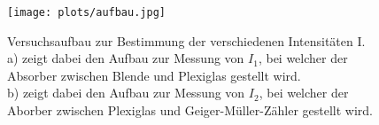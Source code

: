\begin{figure}[H]
    \centering
    \texttt{[image: plots/aufbau.jpg]}
    \caption{Versuchsaufbau zur Bestimmung der verschiedenen Intensitäten I.\\
        a) zeigt dabei den Aufbau zur Messung von $I_1$, bei welcher der Absorber zwischen 
        Blende und Plexiglas gestellt wird.\\
        b) zeigt dabei den Aufbau zur Messung von $I_2$, bei welcher der Aborber zwischen
        Plexiglas und Geiger-Müller-Zähler gestellt wird.\cite[4]{anleitung}
    }
\end{figure}
\label{sec:Durchfuehrung}

